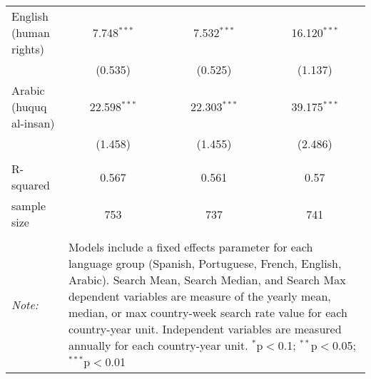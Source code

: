 \begin{table}[!htbp]
\begin{tabular}{@{\extracolsep{5pt}}lccc}
  English (human rights) & 7.748$^{***}$ & 7.532$^{***}$ & 16.120$^{***}$ \\ 
  & (0.535) & (0.525) & (1.137) \\ 
  Arabic (huquq al-insan) & 22.598$^{***}$ & 22.303$^{***}$ & 39.175$^{***}$ \\ 
  & (1.458) & (1.455) & (2.486) \\ 
 \hline \\[-1.8ex] 
R-squared  & 0.567 & 0.561 & 0.57 \\ 
sample size  & 753 & 737 & 741 \\ 
\hline 
\hline \\[-1.8ex] 
\textit{Note:}  & \multicolumn{3}{l}{\parbox[t]{8cm}{Models include a fixed effects parameter for each language group (Spanish, Portuguese, French, English, Arabic). Search Mean, Search Median, and Search Max dependent variables are measure of the yearly mean, median, or max country-week search rate value for each country-year unit. Independent variables are measured annually for each country-year unit. $^{*}$p$<$0.1; $^{**}$p$<$0.05; $^{***}$p$<$0.01}} \\ 
\end{tabular} 
\end{table} 
